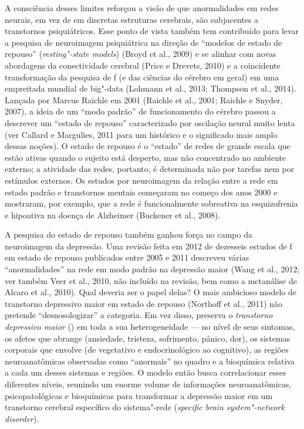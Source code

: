 A consciência desses limites reforçou a visão de que anormalidades em
redes neurais, em vez de em discretas estruturas cerebrais, são
subjacentes a transtornos psiquiátricos. Esse ponto de vista também tem
contribuído para levar a pesquisa de neuroimagem psiquiátrica na direção
de ``modelos de estado de repouso'' (\emph{resting"-state models}) (Broyd
et al., 2009) e se alinhar com novas abordagens da conectividade
cerebral (Price e Drevets, 2010) e a coincidente transformação da
pesquisa de f (e das ciências do cérebro em geral) em uma empreitada
mundial de big"-data (Lohmann et al., 2013; Thompson et al., 2014).
Lançada por Marcus Raichle em 2001 (Raichle et al., 2001; Raichle e
Snyder, 2007), a ideia de um ``modo padrão'' de funcionamento do cérebro
passou a descrever um ``estado de repouso'' caracterizado por oscilação
neural muito lenta (ver Callard e Margulies, 2011 para um histórico e o
significado mais amplo dessas noções). O estado de repouso é o
``estado'' de redes de grande escala que estão ativas quando o sujeito
está desperto, mas não concentrado no ambiente externo; a atividade das
redes, portanto, é determinada não por tarefas nem por estímulos
externos. Os estudos por neuroimagem da relação entre a rede em estado
padrão e transtornos mentais começaram no começo dos anos 2000 e
mostraram, por exemplo, que a rede é funcionalmente sobreativa na
esquizofrenia e hipoativa na doença de Alzheimer (Buckener et al.,
2008).

A pesquisa do estado de repouso também ganhou força no campo da
neuroimagem da depressão. Uma revisão feita em 2012 de dezesseis estudos
de f em estado de repouso publicados entre 2005 e 2011 descreveu
várias ``anormalidades'' na rede em modo padrão na depressão maior (Wang
et al., 2012; ver também Veer et al., 2010, não incluído na revisão, bem
como a metanálise de Alcaro et al., 2010). Qual deveria ser o papel
delas? O mais ambicioso modelo de transtorno depressivo maior em estado
de repouso (Northoff et al., 2011) não pretende ``desnosologizar'' a
categoria. Em vez disso, preserva o \emph{transtorno depressivo maior}
() em toda a sua heterogeneidade --- no nível de seus sintomas, os
afetos que abrange (ansiedade, tristeza, sofrimento, pânico, dor), os
sistemas corporais que envolve (de vegetativo e endocrinológico ao
cognitivo), as regiões neuroanatômicas observadas como ``anormais'' no
quadro e a bioquímica relativa a cada um desses sistemas e regiões. O
modelo então busca correlacionar esses diferentes níveis, reunindo um
enorme volume de informações neuroanatômicas, psicopatológicas e
bioquímicas para transformar a depressão maior em um transtorno cerebral
específico do sistema"-rede (\emph{specific brain system"-network
disorder}).

